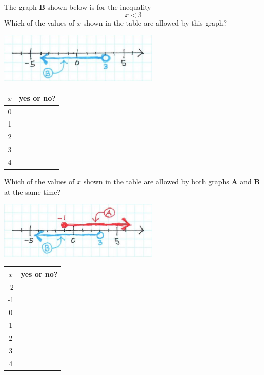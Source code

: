 \begin{myExample}{
    The graph {\sffamily\bfseries B} shown below is for the inequality 
    \[x < 3\]
    Which of the values of $x$ shown in the table are allowed by this graph?
}
    \begin{center}
        \includegraphics[width=3in]{and-2.jpg}
        
        \Large
        \begin{tabular}{c|c}
            $x$ & yes or no? \\
            \toprule
            0& \\
            1& \\
            2& \\
            3& \\
            4& \\
            \bottomrule
        \end{tabular}
    \end{center}
\end{myExample}


\begin{myExample}{
    Which of the values of $x$ shown in the table are allowed by 
    both graphs {\sffamily\bfseries A} and {\sffamily\bfseries B} at the same time?
}
    \begin{center}
        \includegraphics[width=3in]{and-3.jpg}
        
        \Large
        \begin{tabular}{c|c}
            $x$ & yes or no? \\
            \toprule
            -2 & \\
            -1& \\
            0& \\
            1& \\
            2& \\
            3& \\
            4& \\
            \bottomrule
        \end{tabular}
    \end{center}
\end{myExample}



